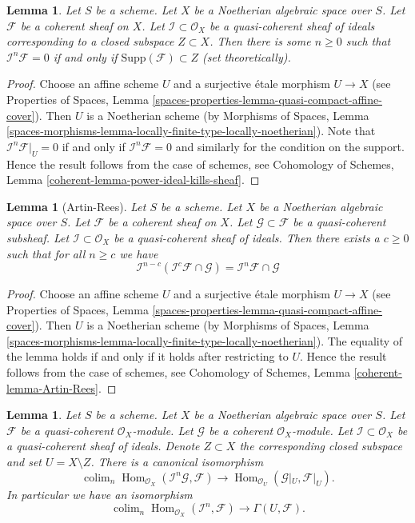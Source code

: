 \documentclass{stacks-project}
\theoremstyle{plain}
\newtheorem{lemma}[subsection]{Lemma}
\theoremstyle{definition}
\theoremstyle{remark}
\numberwithin{equation}{subsection}
\def\colim{\mathop{\mathrm{colim}}\nolimits}
\def\Hom{\mathop{\mathrm{Hom}}\nolimits}
\begin{document}
\begin{lemma}
\label{lemma-power-ideal-kills-sheaf}
Let $S$ be a scheme. Let $X$ be a Noetherian algebraic space over $S$.
Let $\mathcal{F}$ be a coherent sheaf on $X$. Let
$\mathcal{I} \subset \mathcal{O}_X$ be a quasi-coherent sheaf of ideals
corresponding to a closed subspace $Z \subset X$. Then there is some
$n \geq 0$ such that $\mathcal{I}^n\mathcal{F} = 0$ if and only if
$\text{Supp}(\mathcal{F}) \subset Z$ (set theoretically).
\end{lemma}

\begin{proof}
Choose an affine scheme $U$ and a surjective \'etale morphism $U \to X$
(see Properties of Spaces, Lemma
\ref{spaces-properties-lemma-quasi-compact-affine-cover}).
Then $U$ is a Noetherian scheme (by
Morphisms of Spaces, Lemma
\ref{spaces-morphisms-lemma-locally-finite-type-locally-noetherian}).
Note that $\mathcal{I}^n\mathcal{F}|_U = 0$ if and only if
$\mathcal{I}^n\mathcal{F} = 0$ and similarly for the condition on
the support. Hence the result follows from the case of schemes, see
Cohomology of Schemes, Lemma \ref{coherent-lemma-power-ideal-kills-sheaf}.
\end{proof}

\begin{lemma}[Artin-Rees]
\label{lemma-Artin-Rees}
Let $S$ be a scheme. Let $X$ be a Noetherian algebraic space over $S$.
Let $\mathcal{F}$ be a coherent sheaf on $X$. Let
$\mathcal{G} \subset \mathcal{F}$ be a quasi-coherent subsheaf.
Let $\mathcal{I} \subset \mathcal{O}_X$ be a quasi-coherent sheaf of
ideals. Then there exists a $c \geq 0$ such that for all $n \geq c$ we
have
$$
\mathcal{I}^{n - c}(\mathcal{I}^c\mathcal{F} \cap \mathcal{G})
=
\mathcal{I}^n\mathcal{F} \cap \mathcal{G}
$$
\end{lemma}

\begin{proof}
Choose an affine scheme $U$ and a surjective \'etale morphism $U \to X$
(see Properties of Spaces, Lemma
\ref{spaces-properties-lemma-quasi-compact-affine-cover}).
Then $U$ is a Noetherian scheme (by
Morphisms of Spaces, Lemma
\ref{spaces-morphisms-lemma-locally-finite-type-locally-noetherian}).
The equality of the lemma holds if and only if it holds after
restricting to $U$. Hence the result follows from the case of schemes, see
Cohomology of Schemes, Lemma \ref{coherent-lemma-Artin-Rees}.
\end{proof}

\begin{lemma}
\label{lemma-homs-over-open}
Let $S$ be a scheme. Let $X$ be a Noetherian algebraic space over $S$.
Let $\mathcal{F}$ be a quasi-coherent $\mathcal{O}_X$-module.
Let $\mathcal{G}$ be a coherent $\mathcal{O}_X$-module.
Let $\mathcal{I} \subset \mathcal{O}_X$ be a quasi-coherent sheaf of
ideals. Denote $Z \subset X$ the corresponding closed subspace and
set $U = X \setminus Z$. There is a canonical isomorphism
$$
\colim_n \Hom_{\mathcal{O}_X}(\mathcal{I}^n\mathcal{G}, \mathcal{F})
\longrightarrow
\Hom_{\mathcal{O}_U}(\mathcal{G}|_U, \mathcal{F}|_U).
$$
In particular we have an isomorphism
$$
\colim_n \Hom_{\mathcal{O}_X}(\mathcal{I}^n, \mathcal{F})
\longrightarrow
\Gamma(U, \mathcal{F}).
$$
\end{lemma}
\end{document}
